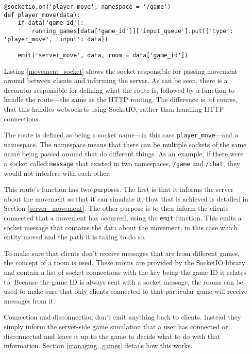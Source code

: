 \noindent
\begin{minipage}{\linewidth}
\begin{lstlisting}[style=py, caption={Socket for passing movement events between clients and server.}, label=movement_socket]
@socketio.on('player_move', namespace = '/game')
def player_move(data):
    if data['game_id']:
        running_games[data['game_id']]['input_queue'].put({'type': 'player_move', 'input': data})

    emit('server_move', data, room = data['game_id'])
\end{lstlisting}
\end{minipage}

Listing \ref{movement_socket} shows the socket responsible for passing movement around between clients and informing the server. As can be seen, there is a decorator responsible for defining what the route is, followed by a function to handle the route---the same as the HTTP routing. The difference is, of course, that this handles websockets using SocketIO, rather than handling HTTP connections.

The route is defined as being a socket name---in this case \texttt{player\_move}---and a namespace. The namespace means that there can be multiple sockets of the same name being passed around that do different things. As an example, if there were a socket called \texttt{message} that existed in two namespaces, \texttt{/game} and \texttt{/chat}, they would not interfere with each other.

This route's function has two purposes. The first is that it informs the server about the movement so that it can simulate it. How that is achieved is detailed in Section \ref{server_movement}. The other purpose is to then inform the clients connected that a movement has occurred, using the \texttt{emit} function. This emits a socket message that contains the data about the movement, in this case which entity moved and the path it is taking to do so.

To make sure that clients don't receive messages that are from different games, the concept of a room is used. These rooms are provided by the SocketIO library and contain a list of socket connections with the key being the game ID it relates to. Because the game ID is always sent with a socket message, the rooms can be used to make sure that only clients connected to that particular game will receive messages from it.

Connection and disconnection don't emit anything back to clients. Instead they simply inform the server-side game simulation that a user has connected or disconnected and leave it up to the game to decide what to do with that information. Section \ref{managing_games} details how this works.

